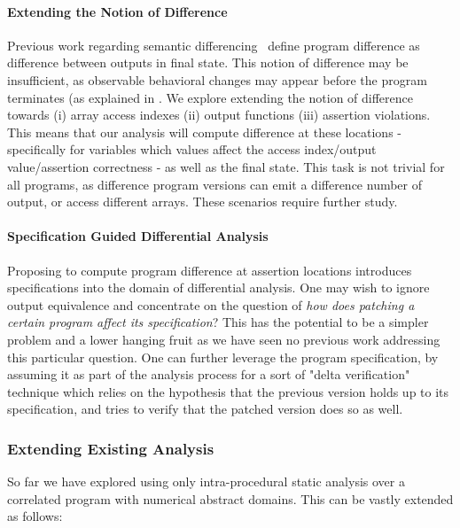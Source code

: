 \paragraph{Extending the Notion of Difference}
Previous work regarding semantic differencing~\cite{DwyerElbaumPerson08, GodlinStrichman09, EnglerRamos11, HawblitzelKawaguchiLahiriRebelo12} define program difference as difference between outputs in final state. This notion of difference may be insufficient, as observable behavioral changes may appear before the program terminates (as explained in . We explore extending the notion of difference towards (i) array access indexes (ii) output functions (iii) assertion violations. This means that our analysis will compute difference at these locations - specifically for variables which values affect the access index/output value/assertion correctness - as well as the final state. This task is not trivial for all programs, as difference program versions can emit a difference number of output, or access different arrays. These scenarios require further study.

\paragraph{Specification Guided Differential Analysis}
Proposing to compute program difference at assertion locations introduces specifications into the domain of differential analysis. One may wish to ignore output equivalence and concentrate on the question of \emph{how does patching a certain program affect its specification}? This has the potential to be a simpler problem and a lower hanging fruit as we have seen no previous work addressing this particular question. One can further leverage the program specification, by assuming it as part of the analysis process for a sort of "delta verification" technique which relies on the hypothesis that the previous version holds up to its specification, and tries to verify that the patched version does so as well.


\subsubsection{Extending Existing Analysis}

So far we have explored using only intra-procedural static analysis over a correlated program with numerical abstract domains. This can be vastly extended as follows:


